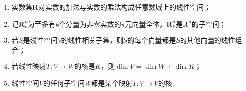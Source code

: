 \begin{enumerate}
\begin{enumerate}
        \item 实数集$\mathbf{R}$对实数的加法与实数的乘法构成任意数域上的线性空间；

        \item 记$\mathbf{R}_k^n$为至多有$k$个分量为非零实数的$n$元向量全体，$\mathbf{R}_k^n$是$\mathbf{R}^n$的子空间；

        \item 若$S$是线性空间$V$的线性相关子集，则$S$的每个向量都是$S$的其他向量的线性组合；

        \item 若线性映射$T\colon V\to W$的核是$K$，则$\dim V=\dim W+\dim K$；

        \item 线性空间$V$的任何子空间$W$都是某个映射$T\colon V\to V$的核.
    \end{enumerate}
\end{enumerate}

\clearpage
